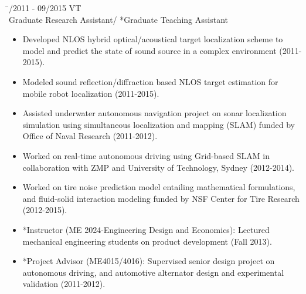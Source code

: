 \documentclass[11pt,letter]{article}
\begin{document}
\begin{tabbing}
	\hspace{3cm} \= /2011 - 09/2015 \> VT\\
	\> Graduate Research Assistant/ *Graduate Teaching Assistant\\
	\> \begin{minipage}{0.8\textwidth}
		\begin{itemize}
			\item Developed NLOS hybrid optical/acoustical target localization scheme to model and predict the state of sound source in a complex environment (2011-2015).
			\item Modeled sound reflection/diffraction based NLOS target estimation for mobile robot localization (2011-2015).
			\item Assisted underwater autonomous navigation project on sonar localization simulation using simultaneous localization and mapping (SLAM) funded by Office of Naval Research (2011-2012).
			\item Worked on real-time autonomous driving using Grid-based SLAM in collaboration with ZMP and University of Technology, Sydney (2012-2014).
			\item Worked on tire noise prediction model entailing mathematical formulations, and fluid-solid interaction modeling funded by NSF Center for Tire Research (2012-2015).
			\item *Instructor (ME 2024-Engineering Design and Economics): Lectured mechanical engineering students on product development (Fall 2013).
			\item *Project Advisor (ME4015/4016): Supervised senior design project on autonomous driving, and automotive alternator design and experimental validation (2011-2012).
		\end{itemize}
	\end{minipage}
\end{tabbing}
\end{document}
